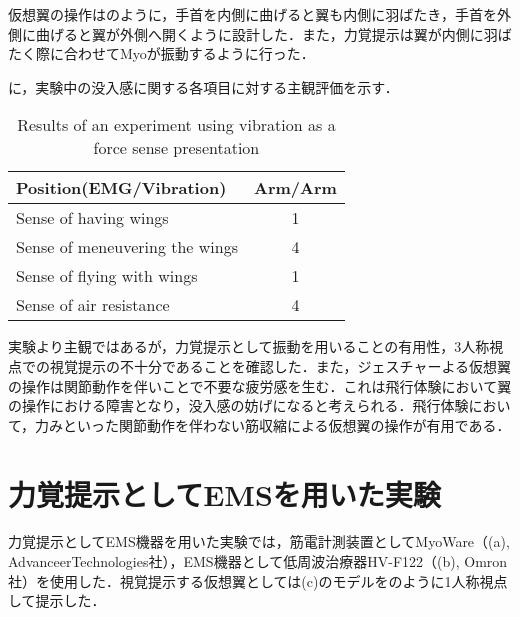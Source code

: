     仮想翼の操作はのように，手首を内側に曲げると翼も内側に羽ばたき，手首を外側に曲げると翼が外側へ開くように設計した．また，力覚提示は翼が内側に羽ばたく際に合わせてMyoが振動するように行った．

    に，実験中の没入感に関する各項目に対する主観評価を示す．
        \begin{table}[h]
            \begin{center}
                \caption{Results of an experiment using vibration as a force sense presentation}
                \scalebox{0.75}
                {
                    \begin{tabular}{l|c}
                        \hline
                        Position(EMG/Vibration) & Arm/Arm \\\hline
                        Sense of having wings & 1 \\
                        Sense of meneuvering the wings & 4 \\
                        Sense of flying with wings & 1 \\
                        Sense of air resistance & 4 \\\hline
                    \end{tabular}
                }
            \end{center}
        \end{table}
    

    実験より主観ではあるが，力覚提示として振動を用いることの有用性，3人称視点での視覚提示の不十分であることを確認した．また，ジェスチャーよる仮想翼の操作は関節動作を伴いことで不要な疲労感を生む．これは飛行体験において翼の操作における障害となり，没入感の妨げになると考えられる．飛行体験において，力みといった関節動作を伴わない筋収縮による仮想翼の操作が有用である．

    \section{力覚提示としてEMSを用いた実験}


    力覚提示としてEMS機器を用いた実験では，筋電計測装置としてMyoWare（(a), AdvanceerTechnologies社），EMS機器として低周波治療器HV-F122（(b), Omron社）を使用した．視覚提示する仮想翼としては(c)のモデルをのように1人称視点して提示した．

